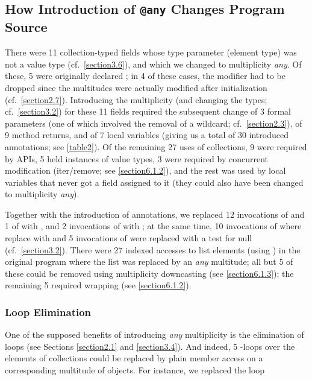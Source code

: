 {\subsection{How Introduction of \texttt{@any} Changes Program Source}
\label{section6.1}

\noindent There were 11 collection-typed fields whose type parameter
(element type) was not a value type (cf.~\autoref{section3.6}), and which we changed
to multiplicity \emph{any}. Of these, 5 were originally declared ;
in 4 of these cases, the  modifier had to be dropped since the
multitudes were actually modified after initialization (cf.~\autoref{section2.7}).
Introducing the multiplicity  (and changing the types;
cf.~\autoref{section3.2}) for these 11 fields required the subsequent change of 3 formal
parameters (one of which involved the removal of a wildcard; cf.~\autoref{section2.3}),
of 9 method returns, and of 7 local variables (giving us a total of 30
introduced  annotations; see \autoref{table2}). Of the remaining 27 uses
of collections, 9 were required by APIs, 5 held instances of value types, 3
were required by concurrent modification (iter/remove; see \autoref{section6.1.2}),
and the rest was used by local variables that never got a field assigned to
it (they could also have been changed to multiplicity \emph{any}).

Together with the introduction of  annotations, we replaced 12
invocations of  and 1 of  with \inline{+=}, and 2
invocations of  with \inline{-=}; at the same time,
10 invocations of  where replace with \inline{|[$\something$]|} and 5
invocations of  were replaced with a test for null
(cf.~\autoref{section3.2}). There were 27 indexed accesses to list elements (using
) in the original program where the list was replaced by an
\emph{any} multitude; all but 5 of these could be removed using
multiplicity downcasting (see \autoref{section6.1.3}); the remaining 5 required
wrapping (see \autoref{section6.1.2}).


\subsubsection{Loop Elimination}
\label{section6.1.1}

\noindent One of the supposed benefits of introducing \emph{any}
multiplicity is the elimination of loops (see Sections \ref{section2.1} and \ref{section3.4}).  And
indeed, 5 -loops over the elements of collections could be
replaced by plain member access on a corresponding multitude of objects. For
instance, we replaced the loop

}
